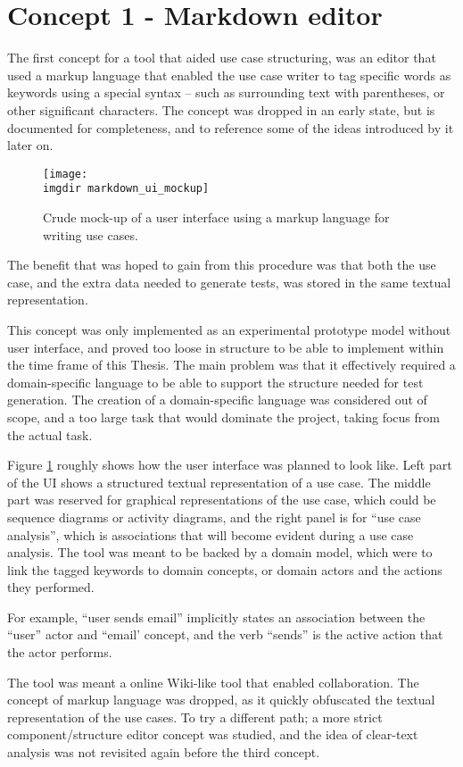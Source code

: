 \section{Concept 1 - Markdown editor}
The first concept for a tool that aided use case structuring, was an editor that used a markup language that enabled the use case writer to tag specific words as keywords using a special syntax -- such as surrounding text with parentheses, or other significant characters. The concept was dropped in an early state, but is documented for completeness, and to reference some of the ideas introduced by it later on.\medskip
\begin{figure}[!htbp]
  \centering
  \texttt{[image: \\imgdir markdown\_ui\_mockup]}
  \caption{Crude mock-up of a user interface using a markup language for writing use cases.}
\label{fig:markdown_ui_mockup}
\end{figure}
\noindent The benefit that was hoped to gain from this procedure was that both the use case, and the extra data needed to generate tests, was stored in the same textual representation.\medskip

\noindent This concept was only implemented as an experimental prototype model without user interface, and proved too loose in structure to be able to implement within the time frame of this Thesis. The main problem was that it effectively required a domain-specific language to be able to support the structure needed for test generation. The creation of a domain-specific language was considered out of scope, and a too large task that would dominate the project, taking focus from the actual task.\medskip

\noindent Figure \ref{fig:markdown_ui_mockup} roughly shows how the user interface was planned to look like. Left part of the UI shows a structured textual representation of a use case. The middle part was reserved for graphical representations of the use case, which could be sequence diagrams or activity diagrams, and the right panel is for ``use case analysis'', which is associations that will become evident during a use case analysis. The tool was meant to be backed by a domain model, which were to link the tagged keywords to domain concepts, or domain actors and the actions they performed.\medskip

\noindent For example, ``user sends email'' implicitly states an association between the ``user'' actor and ``email' concept, and the verb ``sends'' is the active action that the actor performs.\medskip

\noindent The tool was meant a online Wiki-like tool that enabled collaboration. The concept of markup language was dropped, as it quickly obfuscated the textual representation of the use cases. To try a different path; a more strict component/structure editor concept was studied, and the idea of clear-text analysis was not revisited again before the third concept.

